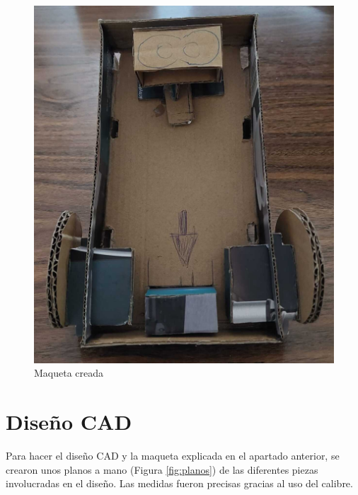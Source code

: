 \begin{figure}[ht!]
\begin{minipage}{0.4\linewidth}
		\includegraphics[width=\linewidth]{figs/cap5/boceto_carton7.jpeg}
	\end{minipage}
	\caption{Maqueta creada}
	\label{fig:maqueta2}
\end{figure}


\section{Diseño CAD}
\label{sec:diseñocad}

Para hacer el diseño CAD y la maqueta explicada en el apartado anterior, se crearon unos planos a mano (Figura \ref{fig:planos}) de las diferentes piezas involucradas en el diseño. Las medidas fueron precisas gracias al uso del calibre.


